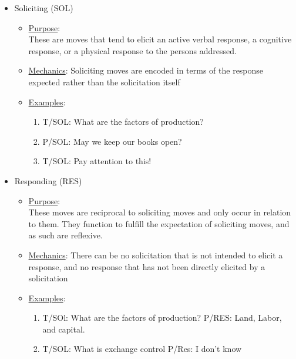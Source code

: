 \documentclass[10pt, letterpaper]{article}
\begin{document}
\begin{itemize}
\begin{itemize}
\begin{enumerate}
\end{enumerate}
\end{itemize}
\item Soliciting (SOL)
\label{sec:org50a0a74}
\begin{itemize}
\item \uline{Purpose}: \\
These are moves that tend to elicit an active verbal response, a cognitive response, or a physical response to the persons addressed.
\item \uline{Mechanics}: Soliciting moves are encoded in terms of the response expected rather than the solicitation itself
\item \uline{Examples}:
\begin{enumerate}
\item T/SOL: What are the factors of production?
\item P/SOL: May we keep our books open?
\item T/SOL: Pay attention to this!
\end{enumerate}
\end{itemize}
\item Responding (RES)
\label{sec:org29554d7}
\begin{itemize}
\item \uline{Purpose}: \\
These moves are reciprocal to soliciting moves and only occur in relation to them. They function to fulfill the expectation of soliciting moves, and as such are reflexive.
\item \uline{Mechanics}: There can be no solicitation that is not intended to elicit a response, and no response that has not been directly elicited by a solicitation
\item \uline{Examples}:
\begin{enumerate}
\item T/SOl: What are the factors of production?
P/RES: Land, Labor, and capital.
\item T/SOL: What is exchange control
P/Res: I don't know
\end{enumerate}
\end{itemize}


\end{itemize}
\end{document}
